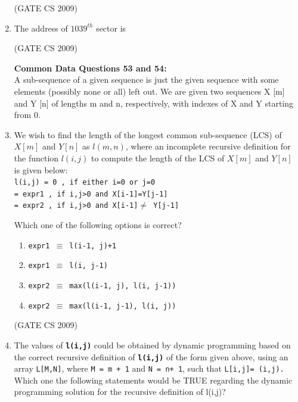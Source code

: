 \documentclass[a4paper, 11pt]{article}
\begin{document}
\begin{enumerate}
    \hfill (GATE CS 2009)

    \item The address of $1039^{th}$ sector is\\
    \begin{enumerate}
    \end{enumerate}
    
    \hfill (GATE CS 2009)

    \textbf{ \big Common Data Questions 53 and 54:} \\
    A sub-sequence of a given sequence is just the given sequence with some elements (possibly none or all) left out. We are given two sequences X [m] and Y [n] of lengths m and n, respectively, with indexes of X and Y starting from 0.
    \item We wish to find the length of the longest common sub-sequence (LCS) of $X[m]$ and $Y[n]$ as $l(m, n)$, where an incomplete recursive definition for the function $l(i, j)$ to compute the length of the LCS of $X[m]$ and $Y[n]$ is given below:\\
    
        \texttt{l(i,j) = 0 , if either i=0 or j=0\\
        = expr1 , if i,j>0 and X[i-1]=Y[j-1]\\
        = expr2 , if i,j>0 and X[i-1]$\neq$ Y[j-1]}

    Which one of the following options is correct?
    \begin{enumerate} 
        \item  \texttt{expr1 $\equiv$ l(i-1, j)+1}
        \item  \texttt{expr1 $\equiv$ l(i, j-1)}
        \item  \texttt{expr2 $\equiv$ max(l(i-1, j), l(i, j-1))}
        \item  \texttt{expr2 $\equiv$ max(l(i-1, j-1), l(i, j))}

    \end{enumerate}

    \hfill (GATE CS 2009)

    \item The values of \texttt{\textbf{l(i,j)}} could be obtained by dynamic programming based on the correct recursive definition of \texttt{\textbf{l(i,j)}} of the form given above, using an array \texttt{L[M,N]}, where \texttt{M = m + 1} and \texttt{N = n+ 1}, such that \texttt{L[i,j]= (i,j).}\\
    Which one the following statements would be TRUE regarding the dynamic programming solution for the recursive definition of l(i,j)?


\end{enumerate}
\end{document}
